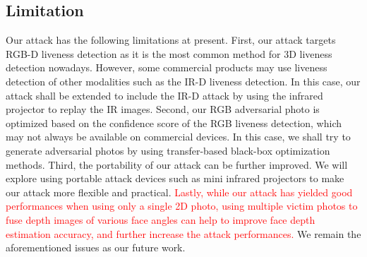 \subsection{Limitation}
Our attack has the following limitations at present. 
First, our attack targets RGB-D  liveness detection as it is the most common method for 3D liveness detection nowadays. However, some commercial products may use liveness detection of other modalities such as the IR-D liveness detection. In this case, our attack shall be extended to include the IR-D attack by using the infrared projector to replay the IR images.
Second, our RGB adversarial photo is optimized based on the confidence score of the RGB liveness detection, which may not always be available on commercial devices. In this case, we shall try to generate adversarial photos by using transfer-based black-box optimization methods.
Third, the portability of our attack can be further improved. We will explore using portable attack devices such as mini infrared projectors to make our attack more flexible and practical. 
\textcolor{red}{Lastly, while our attack has yielded good performances when using only a single 2D photo, using multiple victim photos to fuse depth images of various face angles can help to improve face depth estimation accuracy, and further increase the attack performances.}
We remain the aforementioned issues as our future work.
